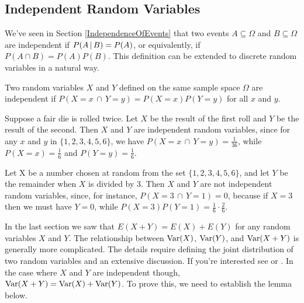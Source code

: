 \subsection*{Independent Random Variables}

We've seen in Section \ref{IndependenceOfEvents} that two events $A \subseteq \Omega$ and $B \subseteq \Omega$ are independent if $P(A \,|\, B) = P(A)$, or equivalently, if $P(A \cap B) = P(A)P(B)$. This definition can be extended to discrete random variables in a natural way.

\begin{defn}\label{IndependenceOfRVs}
Two random variables $X$ and $Y$ defined on the same sample space $\Omega$ are independent if $P(X = x \,\cap\, Y = y) = P(X = x)P(Y = y)$ for all $x$ and $y$.\end{defn}

\begin{examp}Suppose a fair die is rolled twice. Let $X$ be the result of the first roll and $Y$ be the result of the second. Then $X$ and $Y$ are independent random variables, since for any $x$ and $y$ in $\{1,2,3,4,5,6\}$, we have $P(X = x \,\cap\, Y = y) = \frac{1}{36}$, while $P(X = x) = \frac{1}{6}$ and $P(Y=y) = \frac{1}{6}$.
\end{examp}

\begin{examp}Let X be a number chosen at random from the set $\{1,2,3,4,5,6\}$, and let $Y$ be the remainder when $X$ is divided by 3. Then $X$ and $Y$ are not independent random variables, since, for instance, $P(X = 3 \,\cap\, Y = 1) = 0$, because if $X = 3$ then we must have $Y = 0$, while $P(X = 3)P(Y = 1) = \frac{1}{6}\cdot\frac{2}{6}$.
\end{examp}

In the last section we saw that $E(X+Y) = E(X) + E(Y)$ for any random variables $X$ and $Y$. The relationship between $\operatorname{Var}(X)$, $\operatorname{Var}(Y)$, and $\operatorname{Var}(X+Y)$ is generally more complicated. The details require defining the joint distribution of two random variables and an extensive discussion. If you're interested see \cite{Bertsekas} or \cite{Ghahramani}. In the case where $X$ and $Y$ are independent though, $\operatorname{Var}(X+Y) = \operatorname{Var}(X) + \operatorname{Var}(Y)$. To prove this, we need to establish the lemma below.

